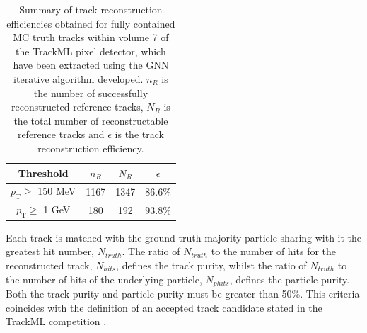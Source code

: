 \begin{table}[htbp]
\caption{Summary of track reconstruction efficiencies obtained for fully contained MC truth tracks within volume 7 of the TrackML pixel detector, which have been extracted using the GNN iterative algorithm developed. $n_R$ is the number of successfully reconstructed reference tracks, $N_R$ is the total number of reconstructable reference tracks and $\epsilon$ is the track reconstruction efficiency. }

\begin{center}
\begin{tabular}{cccc}
\toprule
Threshold & $n_R$ & $N_R$ & $\epsilon$ \\
\hline
$p_{\text{T}} \ge$ 150 MeV    & 1167  & 1347  &  86.6\%    \\
$p_{\text{T}} \ge$ 1 GeV      & 180   & 192   &  93.8\%    \\
\bottomrule
\end{tabular}
\end{center}
\label{tab:trackml-track-recon-effs}
\end{table}





Each track is matched with the ground truth majority particle sharing with it the greatest hit number, $N_{truth}$. The ratio of $N_{truth}$ to the number of hits for the reconstructed track, $N_{hits}$, defines the track purity, whilst the ratio of $N_{truth}$ to the number of hits of the underlying particle, $N_{phits}$, defines the particle purity. Both the track purity and particle purity must be greater than 50\%. This criteria coincides with the definition of an accepted track candidate stated in the TrackML competition \cite{kaggle-trackml}.

